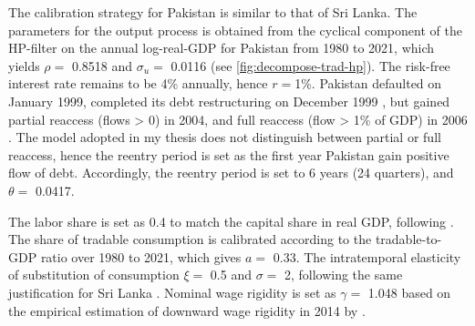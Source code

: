 The calibration strategy for Pakistan is similar to that of Sri Lanka.
The parameters for the output process is obtained from the cyclical component of the HP-filter on the annual log-real-GDP for Pakistan from 1980 to 2021, which yields $\rho = $ 0.8518 and $\sigma_u=$ 0.0116 (see \autoref{fig:decompose-trad-hp}).
The risk-free interest rate remains to be 4\% annually, hence $r= $1\%.
Pakistan defaulted on January 1999, completed its debt restructuring on December 1999 \citep{SPGlobal-default-report}, but gained partial reaccess (flows > 0) in 2004, and full reaccess (flow > 1\% of GDP) in 2006 \citep*[][Table 5.6]{trebesch-2011-sovereign}.
The model adopted in my thesis does not distinguish between partial or full reaccess, hence the reentry period is set as the first year Pakistan gain positive flow of debt. Accordingly, the reentry period is set to 6 years (24 quarters), and $\theta=$ 0.0417.

The labor share is set as 0.4 to match the capital share in real GDP, following \citet{Pakistan-DSGE-calibration}. The share of tradable consumption is calibrated according to the tradable-to-GDP ratio over 1980 to 2021, which gives $a=$ 0.33. The intratemporal elasticity of substitution of consumption $\xi=$ 0.5 and $\sigma=$ 2, following the same justification for Sri Lanka \citep{Pakistan-DSGE-calibration,Uribe-Schmitt-Grohe-textbook}.
Nominal wage rigidity is set as $\gamma=$ 1.048 based on the empirical estimation of downward wage rigidity in 2014 by \citet*{wage-rigidity-data}.

